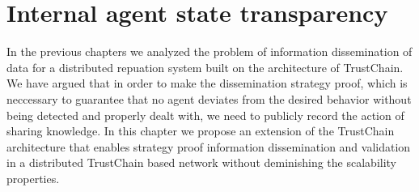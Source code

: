 \chapter{Internal agent state transparency}
\label{chap:state_transparency}

In the previous chapters we analyzed the problem of information dissemination of data for a 
distributed repuation system built on the architecture of TrustChain. We have argued that in order
to make the dissemination strategy proof, which is neccessary to guarantee that no agent deviates 
from the desired behavior without being detected and properly dealt with, we need to publicly record
the action of sharing knowledge. In this chapter we propose an extension of the TrustChain architecture
that enables strategy proof information dissemination and validation in a distributed TrustChain 
based network without deminishing the scalability properties.


